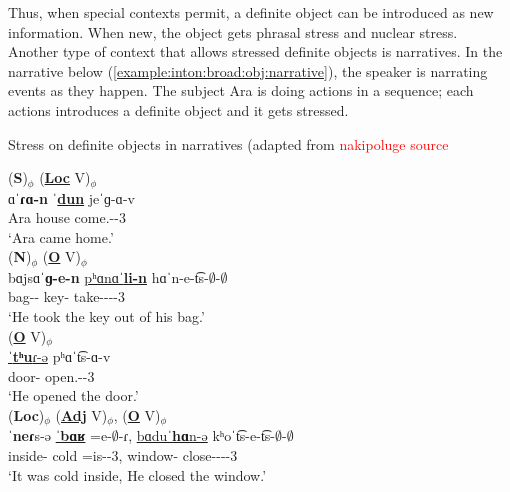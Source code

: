 Thus, when special contexts permit, a definite object can be introduced as new information. When new, the object gets phrasal stress and nuclear stress.  Another type of context that allows stressed definite objects is narratives. In the narrative below (\ref{example:inton:broad:obj:narrative}), the speaker is narrating events as they happen. The subject Ara is doing actions in a sequence; each actions introduces a definite object and it gets stressed. 

\begin{exe}
	\ex Stress on definite objects in narratives (adapted from \textcolor{red}{nakipoluge source} \label{example:inton:broad:obj:narrative}
	\begin{xlist}
		
		\ex \glll (\textbf{S})$_\phi$ (\textbf{\underline{Loc}} V)$_\phi$ \\
		ɑˈ\textbf{ɾɑ-n} ˈ\textbf{\underline{dun}} jeˈɡ-ɑ-v   \\
		Ara house come.{\aorperf}-{\pst}-3{\sg} \\
		\trans `Ara came home.' 
		\\ 
		\ex \glll (\textbf{N})$_\phi$ (\textbf{\underline{O}} V)$_\phi$ \\
		bɑjsɑˈ\textbf{ɡ-e-n}  \underline{pʰɑnɑˈ\textbf{li-n}} hɑˈn-e-t͡s-$\emptyset$-$\emptyset$ \\
		bag-{\abl}-{}  key-{}  take-{\thgloss}-{\aorperf}-{\pst}-3{\sg} \\
		\trans `He took the key out of his bag.'
		\\
		\ex \glll (\textbf{\underline{O}} V)$_\phi$ \\
		\underline{ˈ\textbf{tʰu}ɾ-ə} pʰɑˈt͡s-ɑ-v\\
		door-{} open.{\aorperf}-{\pst}-3{\sg}\\
		\trans `He opened the door.' 
		\\ 
		\ex \glll (\textbf{Loc})$_\phi$ (\textbf{\underline{Adj}} V)$_\phi$, (\textbf{\underline{O}} V)$_\phi$ \\
		ˈ\textbf{neɾ}s-ə \underline{\textbf{ˈbɑʁ}} =e-$\emptyset$-ɾ,  \underline{bɑduˈ\textbf{hɑ}n-ə} kʰoˈt͡s-e-t͡s-$\emptyset$-$\emptyset$  \\
		inside-{} cold =is-{\pst}-3{\sg},  window-{} close-{\thgloss}-{\aorperf}-{\pst}-3{\sg}  \\
		\trans `It was cold inside, He closed the window.' 
		\\ 

\end{xlist}
\end{exe}
